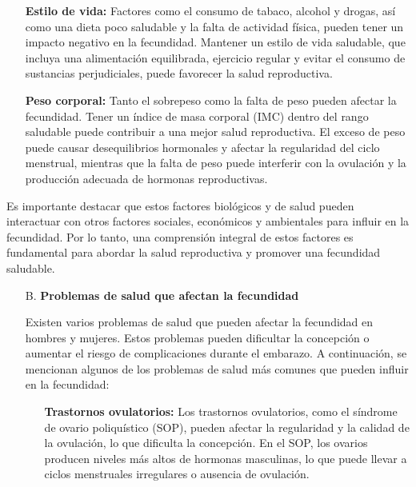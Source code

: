 \documentclass[8pt,a4paper]{beamer}
\begin{document}
{\begin{frame}{}
\begin{block}{}
\begin{enumerate}
\item[\ding{65}] \textbf{Estilo de vida:} Factores como el consumo de tabaco, alcohol y drogas, así como una dieta poco saludable y la falta de actividad física, pueden tener un impacto negativo en la fecundidad. Mantener un estilo de vida saludable, que incluya una alimentación equilibrada, ejercicio regular y evitar el consumo de sustancias perjudiciales, puede favorecer la salud reproductiva.

\item[\ding{65}] \textbf{Peso corporal:} Tanto el sobrepeso como la falta de peso pueden afectar la fecundidad. Tener un índice de masa corporal (IMC) dentro del rango saludable puede contribuir a una mejor salud reproductiva. El exceso de peso puede causar desequilibrios hormonales y afectar la regularidad del ciclo menstrual, mientras que la falta de peso puede interferir con la ovulación y la producción adecuada de hormonas reproductivas.

\end{enumerate}

\end{block}
\end{frame}

\begin{frame}{}
\begin{block}{}
\setlength{\parskip}{3px}
\justifying
Es importante destacar que estos factores biológicos y de salud pueden interactuar con otros factores sociales, económicos y ambientales para influir en la fecundidad. Por lo tanto, una comprensión integral de estos factores es fundamental para abordar la salud reproductiva y promover una fecundidad saludable.

\begin{enumerate}
\setlength{\parskip}{3px}
\justifying
\item[B.] \textbf{Problemas de salud que afectan la fecundidad}

Existen varios problemas de salud que pueden afectar la fecundidad en hombres y mujeres. Estos problemas pueden dificultar la concepción o aumentar el riesgo de complicaciones durante el embarazo. A continuación, se mencionan algunos de los problemas de salud más comunes que pueden influir en la fecundidad:
\begin{enumerate}
\setlength{\parskip}{3px}
\justifying
\item[\ding{65}] \textbf{Trastornos ovulatorios:} Los trastornos ovulatorios, como el síndrome de ovario poliquístico (SOP), pueden afectar la regularidad y la calidad de la ovulación, lo que dificulta la concepción. En el SOP, los ovarios producen niveles más altos de hormonas masculinas, lo que puede llevar a ciclos menstruales irregulares o ausencia de ovulación.


\end{enumerate}
\end{enumerate}
\end{block}
\end{frame}}
\end{document}
